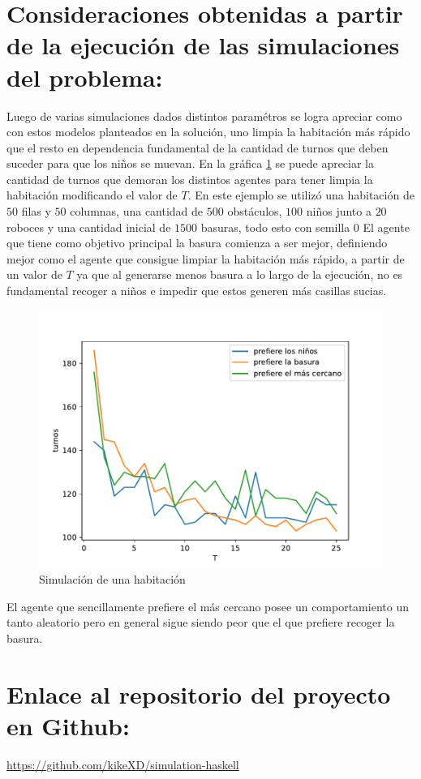 \documentclass[titlepage,11pt]{scrartcl}
\begin{document}
\section{Consideraciones obtenidas a partir de la ejecución de las simulaciones del problema:}
Luego de varias simulaciones dados distintos paramétros se logra apreciar como con estos modelos planteados en la solución, uno limpia la habitación más rápido que el resto en dependencia fundamental de la cantidad de turnos que deben suceder para que los niños se muevan. En la gráfica \ref{fig:simulation} se puede apreciar la cantidad de turnos que demoran los distintos agentes para tener limpia la habitación modificando el valor de $T$. En este ejemplo se utilizó una habitación de $50$ filas y $50$ columnas, una cantidad de $500$ obstáculos, $100$ niños junto a $20$ roboces y una cantidad inicial de $1500$ basuras, todo esto con semilla $0$ El agente que tiene como objetivo principal la basura comienza a ser mejor, definiendo mejor como el agente que consigue limpiar la habitación más rápido, a partir de un valor de $T$ ya que al generarse menos basura a lo largo de la ejecución, no es fundamental recoger a niños e impedir que estos generen más casillas sucias.

\begin{figure}[htb]
    \begin{center}
        \includegraphics[width=\columnwidth]{./media/simulation.pdf}
    \end{center}
    \caption{Simulación de una habitación\label{fig:simulation}}
\end{figure}

El agente que sencillamente prefiere el más cercano posee un comportamiento un tanto aleatorio pero en general sigue siendo peor que el que prefiere recoger la basura.

\section{Enlace al repositorio del proyecto en Github:}
\url{https://github.com/kikeXD/simulation-haskell}
\end{document}
